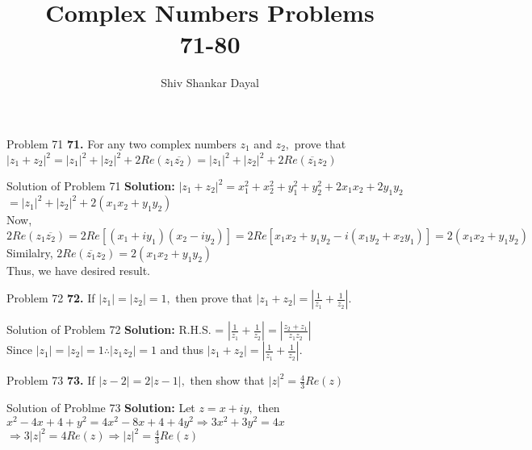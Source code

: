 \documentclass[aspectratio=169,8pt]{beamer}
\title{Complex Numbers Problems\\ 71-80}
\author[Shiv Shankar Dayal]{Shiv Shankar Dayal}
\begin{document}
\begin{frame}
  \titlepage
\end{frame}
\begin{frame}{Problem 71}
  \textbf{71.} For any two complex numbers $z_1$ and $z_2,$ prove that $|z_1 + z_2|^2 = |z_1|^2 + |z_2|^2 + 2Re(z_1\overline{z_2}) =
  |z_1|^2 + |z_2|^2 + 2Re(\overline{z_1}z_2)$
\end{frame}
\begin{frame}{Solution of Problem 71}
  \textbf{Solution:} $|z_1 + z_2|^2 = x_1^2 + x_2^2 + y_1^2 + y_2^2 + 2x_1x_2 + 2y_1y_2$\\
  \vspace*{0.2cm}
  $= |z_1|^2 + |z_2|^2 + 2(x_1x_2 + y_1y_2)$\\
  \vspace*{0.2cm}
  Now, $2Re(z_1\overline{z_2}) = 2Re[(x_1 + iy_1)(x_2 - iy_2)] = 2Re[x_1x_2 + y_1y_2 -i(x_1y_2 + x_2y_1)] = 2(x_1x_2 + y_1y_2)$\\
  \vspace*{0.2cm}
  Similalry, $2Re(\overline{z_1}z_2) = 2(x_1x_2 + y_1y_2)$\\
  \vspace*{0.2cm}
  Thus, we have desired result.
\end{frame}
\begin{frame}{Problem 72}
  \textbf{72.} If $|z_1| = |z_2| = 1,$ then prove that $|z_1 + z_2| = \left|\frac{1}{z_1} + \frac{1}{z_2}\right|.$
\end{frame}
\begin{frame}{Solution of Problem 72}
  \textbf{Solution:} R.H.S. = $\left|\frac{1}{z_1} + \frac{1}{z_2}\right| = \left|\frac{z_2 + z_1}{z_1z_2}\right|$\\
  \vspace*{0.2cm}
  Since $|z_1| = |z_2| = 1 \therefore |z_1z_2| = 1$ and thus $|z_1 + z_2| = \left|\frac{1}{z_1} + \frac{1}{z_2}\right|.$
\end{frame}
\begin{frame}{Problem 73}
  \textbf{73.} If $|z - 2| = 2|z - 1|,$ then show that $|z|^2 = \frac{4}{3}Re(z)$
\end{frame}
\begin{frame}{Solution of Problme 73}
  \textbf{Solution:} Let $z = x + iy,$ then $x^2 - 4x + 4 + y^2 = 4x^2 - 8x + 4 + 4y^2 \Rightarrow 3x^2 + 3y^2 = 4x$\\
  \vspace*{0.2cm}
  $\Rightarrow 3|z|^2 = 4Re(z) \Rightarrow |z|^2 = \frac{4}{3}Re(z)$
\end{frame}
\end{document}
